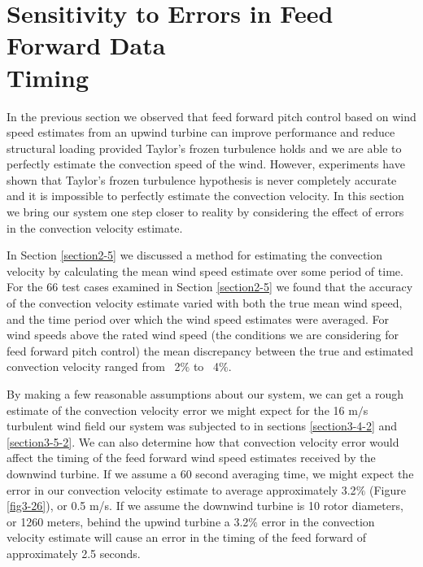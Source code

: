 
\section{Sensitivity to Errors in Feed Forward Data \\
		Timing}  \label{section3-6}
In the previous section we observed that feed forward pitch control based on wind speed estimates from an upwind turbine can improve performance and reduce structural loading provided Taylor's frozen turbulence holds and we are able to perfectly estimate the convection speed of the wind. However, experiments have shown that Taylor's frozen turbulence hypothesis is never completely accurate and it is impossible to perfectly estimate the convection velocity. In this section we bring our system one step closer to reality by considering the effect of errors in the convection velocity estimate.

In Section \ref{section2-5} we discussed a method for estimating the convection velocity by calculating the mean wind speed estimate over some period of time. For the 66 test cases examined in Section \ref{section2-5} we found that the accuracy of the convection velocity estimate varied with both the true mean wind speed, and the time period over which the wind speed estimates were averaged. For wind speeds above the rated wind speed (the conditions we are considering for feed forward pitch control) the mean discrepancy between the true and estimated convection velocity ranged from ~2$\%$ to ~4$\%$.

By making a few reasonable assumptions about our system, we can get a rough estimate of the convection velocity error we might expect for the 16 m$/$s turbulent wind field our system was subjected to in sections \ref{section3-4-2} and \ref{section3-5-2}. We can also determine how that convection velocity error would affect the timing of the feed forward wind speed estimates received by the downwind turbine. If we assume a 60 second averaging time, we might expect the error in our convection velocity estimate to average approximately 3.2$\%$ (Figure \ref{fig3-26}), or 0.5 m/s. If we assume the downwind turbine is 10 rotor diameters, or 1260 meters, behind the upwind turbine a 3.2$\%$ error in the convection velocity estimate will cause an error in the timing of the feed forward of approximately 2.5 seconds.

